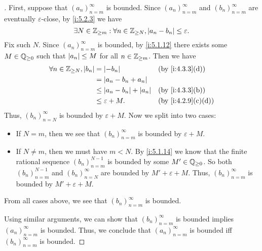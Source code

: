 \begin{proof}[]
  First, suppose that \((a_n)_{n = m}^\infty\) is bounded.
  Since \((a_n)_{n = m}^{\infty}\) and \((b_n)_{n = m}^{\infty}\) are eventually \(\varepsilon\)-close, by \cref{i:5.2.3} we have
  \[
    \exists N \in \mathbb{Z}_{\geq m} : \forall n \in \mathbb{Z}_{\geq N}, \left\lvert a_n - b_n\right\rvert \leq \varepsilon.
  \]
  Fix such \(N\).
  Since \((a_n)_{n = m}^\infty\) is bounded, by \cref{i:5.1.12} there exists some \(M \in \mathbb{Q}_{\geq 0}\) such that \(\left\lvert a_n\right\rvert \leq M\) for all \(n \in \mathbb{Z}_{\geq m}\).
  Then we have
  \begin{align*}
    \forall n \in \Z_{\geq N}, \abs{b_n} & = \abs{-b_n}                     &  & \by{i:4.3.3}[d]   \\
                                         & = \abs{a_n - b_n + a_n}                                 \\
                                         & \leq \abs{a_n - b_n} + \abs{a_n} &  & \by{i:4.3.3}[b]   \\
                                         & \leq \varepsilon + M.            &  & \by{i:4.2.9}[c,d]
  \end{align*}
  Thus, \((b_n)_{n = N}^\infty\) is bounded by \(\varepsilon + M\).
  Now we split into two cases:
  \begin{itemize}
    \item If \(N = m\), then we see that \((b_n)_{n = m}^\infty\) is bounded by \(\varepsilon + M\).
    \item If \(N \neq m\), then we must have \(m < N\).
          By \cref{i:5.1.14} we know that the finite rational sequence \((b_n)_{n = m}^{N - 1}\) is bounded by some \(M' \in \mathbb{Q}_{\geq 0}\).
          So both \((b_n)_{n = m}^{N - 1}\) and \((b_n)_{n = N}^\infty\) are bounded by \(M' + \varepsilon + M\).
          Thus, \((b_n)_{n = m}^\infty\) is bounded by \(M' + \varepsilon + M\).
  \end{itemize}
  From all cases above, we see that \((b_n)_{n = m}^\infty\) is bounded.

  Using similar arguments, we can show that \((b_n)_{n = m}^\infty\) is bounded implies \((a_n)_{n = m}^\infty\) is bounded.
  Thus, we conclude that \((a_n)_{n = m}^\infty\) is bounded iff \((b_n)_{n = m}^\infty\) is bounded.
\end{proof}
